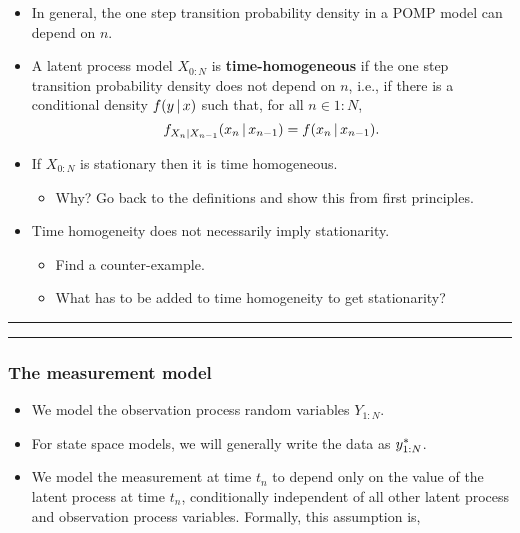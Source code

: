 \documentclass[]{article}
\providecommand{\tightlist}{%
  \setlength{\itemsep}{0pt}\setlength{\parskip}{0pt}}
\begin{document}
\begin{itemize}
\item
  In general, the one step transition probability density in a POMP
  model can depend on \(n\).
\item
  A latent process model \(X_{0:N}\) is \textbf{time-homogeneous} if the
  one step transition probability density does not depend on \(n\),
  i.e., if there is a conditional density \(f(y{\, | \,} x)\) such that,
  for all \(n\in 1:N\),
  \[  f_{X_n|X_{n-1}}(x_n{\, | \,} x_{n-1})= f(x_n{\, | \,} x_{n-1}).\]
\item
  If \(X_{0:N}\) is stationary then it is time homogeneous.

  \begin{itemize}
  \tightlist
  \item
    Why? Go back to the definitions and show this from first principles.
  \end{itemize}
\item
  Time homogeneity does not necessarily imply stationarity.

  \begin{itemize}
  \item
    Find a counter-example.
  \item
    What has to be added to time homogeneity to get stationarity?
  \end{itemize}
\end{itemize}

\begin{center}\rule{0.5\linewidth}{\linethickness}\end{center}

\begin{center}\rule{0.5\linewidth}{\linethickness}\end{center}

\subsubsection{The measurement model}\label{the-measurement-model}

\begin{itemize}
\item
  We model the observation process random variables \(Y_{1:N}\).
\item
  For state space models, we will generally write the data as
  \(y_{1:N}^*\).
\item
  We model the measurement at time \(t_n\) to depend only on the value
  of the latent process at time \(t_n\), conditionally independent of
  all other latent process and observation process variables. Formally,
  this assumption is,
\end{itemize}
\end{document}
